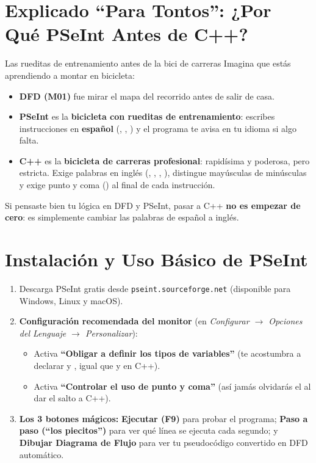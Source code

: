 \documentclass[11pt,letterpaper]{article}
\begin{document}
\section{Explicado ``Para Tontos'': ¿Por Qué PSeInt Antes de C++?}


\begin{paratontos}{Las rueditas de entrenamiento antes de la bici de carreras}
Imagina que estás aprendiendo a montar en bicicleta:
\begin{itemize}
  \item \textbf{DFD (M01)} fue mirar el mapa del recorrido antes de salir de casa.
  \item \textbf{PSeInt} es la \textbf{bicicleta con rueditas de entrenamiento}: escribes instrucciones en \textbf{español} (, , ) y el programa te avisa en tu idioma si algo falta.
  \item \textbf{C++} es la \textbf{bicicleta de carreras profesional}: rapidísima y poderosa, pero estricta. Exige palabras en inglés (, , , ), distingue mayúsculas de minúsculas y exige punto y coma (\codigo{;}) al final de cada instrucción.
\end{itemize}
Si pensaste bien tu lógica en DFD y PSeInt, pasar a C++ \textbf{no es empezar de cero}: es simplemente cambiar las palabras de español a inglés.
\end{paratontos}

\section{Instalación y Uso Básico de PSeInt}

\begin{enumerate}
  \item Descarga PSeInt gratis desde \texttt{pseint.sourceforge.net} (disponible para Windows, Linux y macOS).
  \item \textbf{Configuración recomendada del monitor} (en \textit{Configurar $\rightarrow$ Opciones del Lenguaje $\rightarrow$ Personalizar}):
    \begin{itemize}
      \item Activa \textbf{``Obligar a definir los tipos de variables''} (te acostumbra a declarar  y , igual que  y  en C++).
      \item Activa \textbf{``Controlar el uso de punto y coma''} (así jamás olvidarás el \codigo{;} al dar el salto a C++).
    \end{itemize}
  \item \textbf{Los 3 botones mágicos:} \textbf{Ejecutar (F9)} para probar el programa; \textbf{Paso a paso (``los piecitos'')} para ver qué línea se ejecuta cada segundo; y \textbf{Dibujar Diagrama de Flujo} para ver tu pseudocódigo convertido en DFD automático.
\end{enumerate}
\end{document}
